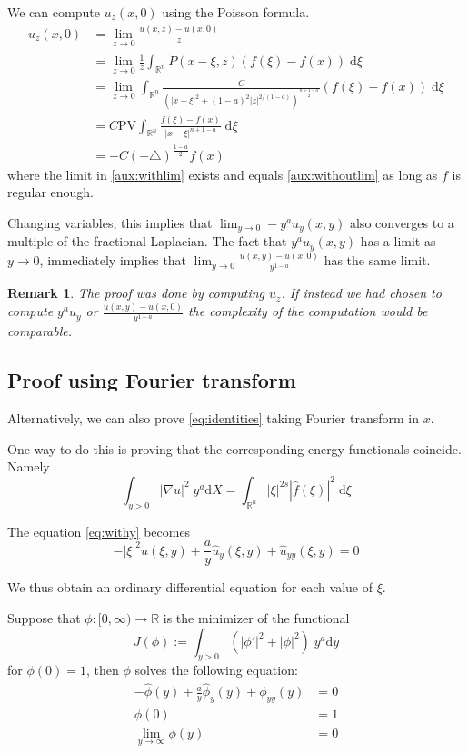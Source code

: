 \documentclass[letterpaper]{article}
\newtheorem{preremark}[thm]{Remark}
\newenvironment{remark}{\begin{preremark}\rm}{\medskip \end{preremark}}
\numberwithin{equation}{section}
\newcommand{\abs}[1]{\left\vert#1\right\vert}
\newcommand{\R}{\mathbb R}
\newcommand{\grad} {\nabla}
\newcommand{\lap} {\triangle}
\newcommand{\dd} {\; \mathrm{d}}
\newcommand{\partz}[1] {#1_z}
\newcommand{\ydd} {\; y^a \mathrm{d}}
\begin{document}
We can compute $\partz u(x,0)$ using the Poisson formula.
\begin{align}
 \partz u(x,0) &= \lim_{z \to 0} \frac{u(x,z) - u(x,0)} {z} \\
 &= \lim_{z \to 0} \frac{1}{z} \int_{\R^n} \tilde P(x-\xi,z) (f(\xi) - f(x)) \dd \xi \\
 &= \lim_{z \to 0} \int_{\R^n} \frac{C}{\left(\abs{x-\xi}^2 + (1-a)^2 \abs{z}^{2/(1-a)} \right)^{\frac{n+1-a}{2}}} (f(\xi) - f(x)) \dd \xi \label{aux:withlim} \\
 &= C \mathrm{PV} \int_{\R^n} \frac{f(\xi) - f(x)}{\abs{x-\xi}^{n+1-a}} \dd \xi \label{aux:withoutlim}\\
 &= -C(-\lap)^{\frac{1-a}{2}} f(x)
\end{align}
where the limit in \eqref{aux:withlim} exists and equals \eqref{aux:withoutlim} as long as $f$ is regular enough.

Changing variables, this implies that $\lim_{y \to 0} -y^a u_y(x,y)$ also converges to a multiple of the fractional Laplacian. The fact that $y^a u_y(x,y)$ has a limit as $y \to 0$, immediately implies that $\lim_{y \to 0} \frac{u(x,y)-u(x,0)}{y^{1-a}}$ has the same limit.

\begin{remark}
The proof was done by computing $u_z$. If instead we had chosen to compute $y^a u_y$ or $\frac{u(x,y)-u(x,0)}{y^{1-a}}$ the complexity of the computation would be comparable.
\end{remark}

\subsection{Proof using Fourier transform} \label{sec:ft}
Alternatively, we can also prove \eqref{eq:identities} taking Fourier transform in $x$. 

One way to do this is proving that the corresponding energy functionals coincide. Namely
\begin{equation} \label{eq:energies}
 \int_{y>0} \abs{\grad u}^2 \ydd X = \int_{\R^n} \abs{\xi}^{2s} \abs{ \hat f(\xi) }^2 \dd \xi
\end{equation}

The equation \eqref{eq:withy} becomes
\[ -\abs{\xi}^2 \hat u(\xi,y) +\frac{a}{y} \hat u_y (\xi,y) + \hat u_{yy}(\xi,y) = 0 \]

We thus obtain an ordinary differential equation for each value of $\xi$. 

Suppose that $\phi : [0,\infty) \to \R$ is the minimizer of the functional
\[ J(\phi) := \int_{y>0} (\abs{\phi'}^2 + \abs{\phi}^2) \ydd y\]
for $\phi(0)=1$, then $\phi$ solves the following equation:
\begin{align*}
 -\hat \phi (y) +\frac{a}{y} \hat \phi_y(y) + \phi_{yy}(y) &= 0 \\
 \phi(0) &= 1 \\
 \lim_{y \to \infty} \phi(y) &=0
\end{align*}
\end{document}
